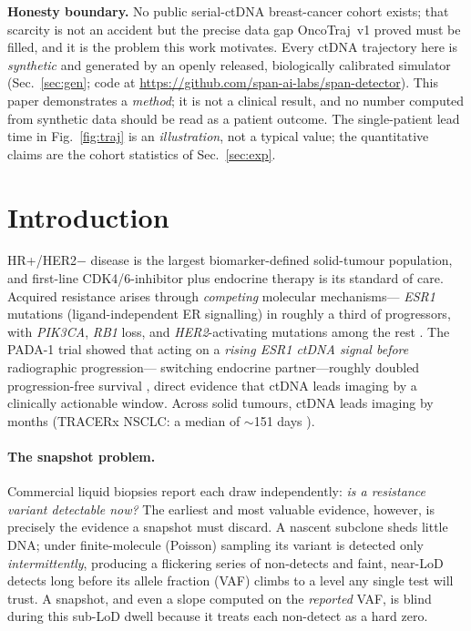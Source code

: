 \documentclass[11pt]{article}
\newcommand{\1}{\mathbf{1}}
\begin{document}
\vspace{-0.4em}
\begin{honesty}
\small\textbf{Honesty boundary.} No public serial-ctDNA breast-cancer cohort
exists; that scarcity is not an accident but the precise data gap OncoTraj~v1
\citep{sarkar2026oncotraj} proved must be filled, and it is the problem this work
motivates. Every ctDNA trajectory
here is \emph{synthetic} and generated by an openly released, biologically
calibrated simulator (Sec.~\ref{sec:gen}; code at \url{https://github.com/span-ai-labs/span-detector}). This paper demonstrates a
\emph{method}; it is not a clinical result, and no number computed from synthetic
data should be read as a patient outcome. The single-patient lead time in
Fig.~\ref{fig:traj} is an \emph{illustration}, not a typical value; the
quantitative claims are the cohort statistics of Sec.~\ref{sec:exp}.
\end{honesty}

\section{Introduction}
HR+/HER2$-$ disease is the largest biomarker-defined solid-tumour population, and
first-line CDK4/6-inhibitor plus endocrine therapy is its standard of care.
Acquired resistance arises through \emph{competing} molecular mechanisms---
\emph{ESR1} mutations (ligand-independent ER signalling) in roughly a third of
progressors, with \emph{PIK3CA}, \emph{RB1} loss, and \emph{HER2}-activating
mutations among the rest \citep{brett2021esr1}. The PADA-1 trial showed that
acting on a \emph{rising ESR1 ctDNA signal before} radiographic progression---
switching endocrine partner---roughly doubled progression-free survival
\citep{bidard2022pada1}, direct evidence that ctDNA leads imaging by a
clinically actionable window. Across solid tumours, ctDNA leads imaging by months
(TRACERx NSCLC: a median of $\sim$151 days \citep{abbosh2023tracerx}).

\paragraph{The snapshot problem.}
Commercial liquid biopsies report each draw independently: \emph{is a resistance
variant detectable now?} The earliest and most valuable evidence, however, is
precisely the evidence a snapshot must discard. A nascent subclone sheds little
DNA; under finite-molecule (Poisson) sampling its variant is detected only
\emph{intermittently}, producing a flickering series of non-detects and faint,
near-LoD detects long before its allele fraction (VAF) climbs to a level any
single test will trust. A snapshot, and even a slope computed on the
\emph{reported} VAF, is blind during this sub-LoD dwell because it treats each
non-detect as a hard zero.
\end{document}
